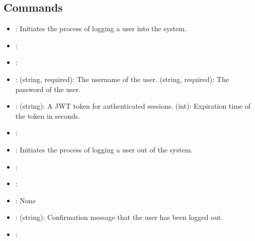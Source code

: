 \documentclass[letterpaper,10pt,english]{sphinxmanual}
\begin{document}
\subsection{Commands}
\label{\detokenize{administration_concession_system/authorization_service:commands}}
\sphinxAtStartPar
{}
\begin{itemize}
\item {} 
\sphinxAtStartPar
{}: Initiates the process of logging a user into the system.

\item {} 
\sphinxAtStartPar
{}: 

\item {} 
\sphinxAtStartPar
{}: 

\item {} 
\sphinxAtStartPar
{}:
\sphinxhyphen{}  (string, required): The username of the user.
\sphinxhyphen{}  (string, required): The password of the user.

\item {} 
\sphinxAtStartPar
{}:
\sphinxhyphen{}  (string): A JWT token for authenticated sessions.
\sphinxhyphen{}  (int): Expiration time of the token in seconds.

\item {} 
\sphinxAtStartPar
{}: 

\end{itemize}

\sphinxAtStartPar
{}
\begin{itemize}
\item {} 
\sphinxAtStartPar
{}: Initiates the process of logging a user out of the system.

\item {} 
\sphinxAtStartPar
{}: 

\item {} 
\sphinxAtStartPar
{}: 

\item {} 
\sphinxAtStartPar
{}: None

\item {} 
\sphinxAtStartPar
{}:
\sphinxhyphen{}  (string): Confirmation message that the user has been logged out.

\item {} 
\sphinxAtStartPar
{}: 

\end{itemize}
\end{document}
